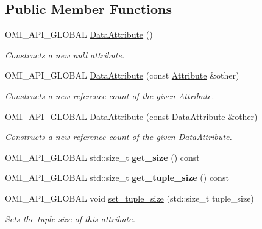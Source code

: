 \subsection*{Public Member Functions}
\begin{DoxyCompactItemize}
\item 
O\+M\+I\+\_\+\+A\+P\+I\+\_\+\+G\+L\+O\+B\+AL \hyperlink{classomi_1_1_data_attribute_abd881b4d4cecbaa28cffcde63ca64fac}{Data\+Attribute} ()
\begin{DoxyCompactList}\small\item\em Constructs a new null attribute. \end{DoxyCompactList}\item 
O\+M\+I\+\_\+\+A\+P\+I\+\_\+\+G\+L\+O\+B\+AL \hyperlink{classomi_1_1_data_attribute_aedb930a671161cd95858184fd9474e2b}{Data\+Attribute} (const \hyperlink{classomi_1_1_attribute}{Attribute} \&other)
\begin{DoxyCompactList}\small\item\em Constructs a new reference count of the given \hyperlink{classomi_1_1_attribute}{Attribute}. \end{DoxyCompactList}\item 
O\+M\+I\+\_\+\+A\+P\+I\+\_\+\+G\+L\+O\+B\+AL \hyperlink{classomi_1_1_data_attribute_a8b07c9dddb09755e07769eae8a4d4758}{Data\+Attribute} (const \hyperlink{classomi_1_1_data_attribute}{Data\+Attribute} \&other)\hypertarget{classomi_1_1_data_attribute_a8b07c9dddb09755e07769eae8a4d4758}{}\label{classomi_1_1_data_attribute_a8b07c9dddb09755e07769eae8a4d4758}

\begin{DoxyCompactList}\small\item\em Constructs a new reference count of the given \hyperlink{classomi_1_1_data_attribute}{Data\+Attribute}. \end{DoxyCompactList}\item 
O\+M\+I\+\_\+\+A\+P\+I\+\_\+\+G\+L\+O\+B\+AL std\+::size\+\_\+t {\bfseries get\+\_\+size} () const \hypertarget{classomi_1_1_data_attribute_a56a3bc513bdb6669c051136f1e3b39b1}{}\label{classomi_1_1_data_attribute_a56a3bc513bdb6669c051136f1e3b39b1}

\item 
O\+M\+I\+\_\+\+A\+P\+I\+\_\+\+G\+L\+O\+B\+AL std\+::size\+\_\+t {\bfseries get\+\_\+tuple\+\_\+size} () const \hypertarget{classomi_1_1_data_attribute_a1419e9a7c7f81f8178ab9a9d1f5b9925}{}\label{classomi_1_1_data_attribute_a1419e9a7c7f81f8178ab9a9d1f5b9925}

\item 
O\+M\+I\+\_\+\+A\+P\+I\+\_\+\+G\+L\+O\+B\+AL void \hyperlink{classomi_1_1_data_attribute_ae2549b943c913546fa7a85be1e8f6823}{set\+\_\+tuple\+\_\+size} (std\+::size\+\_\+t tuple\+\_\+size)
\begin{DoxyCompactList}\small\item\em Sets the tuple size of this attribute. \end{DoxyCompactList}\end{DoxyCompactItemize}
